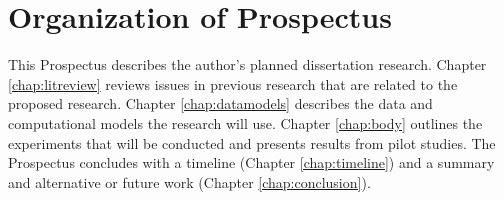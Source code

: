 \section{Organization of Prospectus}

This Prospectus describes the author's planned dissertation research. Chapter \ref{chap:litreview} reviews issues in previous research that are related to the proposed research. Chapter \ref{chap:datamodels} describes the data and computational models the research will use. Chapter \ref{chap:body} outlines the experiments that will be conducted and presents results from pilot studies. The Prospectus concludes with a timeline (Chapter \ref{chap:timeline}) and a summary and alternative or future work (Chapter \ref{chap:conclusion}).

